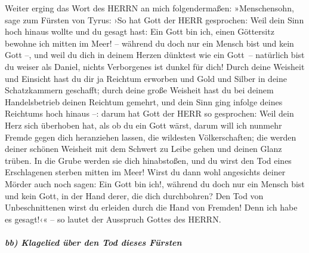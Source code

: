 Weiter erging das Wort des HERRN an mich folgendermaßen:
»Menschensohn, sage zum Fürsten von Tyrus: ›So hat Gott
der HERR gesprochen: Weil dein Sinn hoch hinaus wollte und du gesagt
hast: Ein Gott bin ich, einen Göttersitz bewohne ich mitten im Meer! --
während du doch nur ein Mensch bist und kein Gott --, und weil du dich
in deinem Herzen dünktest wie ein Gott~-- natürlich bist
du weiser als Daniel, nichts Verborgenes ist dunkel für dich!
Durch deine Weisheit und Einsicht hast du dir ja Reichtum
erworben und Gold und Silber in deine Schatzkammern geschafft;
durch deine große Weisheit hast du bei deinem
Handelsbetrieb deinen Reichtum gemehrt, und dein Sinn ging infolge
deines Reichtums hoch hinaus --: darum hat Gott der HERR
so gesprochen: Weil dein Herz sich überhoben hat, als ob du ein Gott
wärst, darum will ich nunmehr Fremde gegen dich
heranziehen lassen, die wildesten Völkerschaften; die werden deiner
schönen Weisheit mit dem Schwert zu Leibe gehen und deinen Glanz trüben.
In die Grube werden sie dich hinabstoßen, und du wirst den
Tod eines Erschlagenen sterben mitten im Meer! Wirst du
dann wohl angesichts deiner Mörder auch noch sagen: Ein Gott bin ich!,
während du doch nur ein Mensch bist und kein Gott, in der Hand derer,
die dich durchbohren? Den Tod von Unbeschnittenen wirst
du erleiden durch die Hand von Fremden! Denn ich habe es gesagt!‹« -- so
lautet der Ausspruch Gottes des HERRN.

\hypertarget{bb-klagelied-uxfcber-den-tod-dieses-fuxfcrsten}{%
\subparagraph{bb) Klagelied über den Tod dieses
Fürsten}\label{bb-klagelied-uxfcber-den-tod-dieses-fuxfcrsten}}

